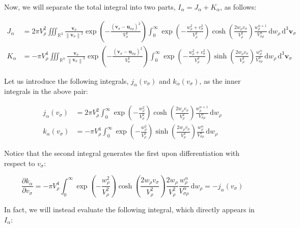 Now, we will separate the total integral into two parts, $I_\alpha=J_\alpha+K_\alpha$, as follows:

\begin{align*}
    J_\alpha&=2\pi V_\rho^2\iiint_{\mathbb{R}^3}\frac{\mathbf{v}_\sigma}{\left\|\mathbf{v}_\sigma\right\|^2}\exp{\left(-\frac{\left(\mathbf{v}_\sigma-\mathbf{u}_{\sigma\rho}\right)^2}{V_\sigma^2}\right)}\int_0^\infty\exp{\left(-\frac{w_\rho^2+v_\sigma^2}{V_\rho^2}\right)}\cosh{\left(\frac{2w_\rho v_\sigma}{V_\rho^2}\right)}\frac{w_\rho^{\alpha+1}}{V_{\sigma\rho}^\alpha}\,\mathrm{d}w_\rho\,\mathrm{d^3}\mathbf{v}_\sigma\\
    K_\alpha&=-\pi V_\rho^4\iiint_{\mathbb{R}^3}\frac{\mathbf{v}_\sigma}{\left\|\mathbf{v}_\sigma\right\|^3}\exp{\left(-\frac{\left(\mathbf{v}_\sigma-\mathbf{u}_{\sigma\rho}\right)^2}{V_\sigma^2}\right)}\int_0^\infty\exp{\left(-\frac{w_\rho^2+v_\sigma^2}{V_\rho^2}\right)}\sinh{\left(\frac{2w_\rho v_\sigma}{V_\rho^2}\right)}\frac{w_\rho^{\alpha}}{V_{\sigma\rho}^\alpha}\,\mathrm{d}w_\rho\,\mathrm{d^3}\mathbf{v}_\sigma
\end{align*}

Let us introduce the following integrals, $j_\alpha(v_\sigma)$ and $k_\alpha(v_\sigma)$, as the inner integrals in the above pair:

\begin{align*}
    j_\alpha(v_\sigma)&=2\pi V_\rho^2\int_0^\infty\exp{\left(-\frac{w_\rho^2}{V_\rho^2}\right)}\cosh{\left(\frac{2w_\rho v_\sigma}{V_\rho^2}\right)}\frac{w_\rho^{\alpha+1}}{V_{\sigma\rho}^\alpha}\,\mathrm{d}w_\rho\\
    k_\alpha(v_\sigma)&=-\pi V_\rho^4\int_0^\infty\exp{\left(-\frac{w_\rho^2}{V_\rho^2}\right)}\sinh{\left(\frac{2w_\rho v_\sigma}{V_\rho^2}\right)}\frac{w_\rho^\alpha}{V_{\sigma\rho}^\alpha}\,\mathrm{d}w_\rho
\end{align*}

Notice that the second integral generates the first upon differentiation with respect to $v_\sigma$:

\begin{equation*}
    \frac{\partial k_\alpha}{\partial v_\sigma}=-\pi V_\rho^4\int_0^\infty\exp{\left(-\frac{w_\rho^2}{V_\rho^2}\right)}\cosh{\left(\frac{2 w_\rho v_\sigma}{V_\rho^2}\right)}\frac{2 w_\rho}{V_\rho^2}\frac{w_\rho^\alpha}{V_{\sigma\rho}^\alpha}\,\mathrm{d}w_\rho=-j_\alpha(v_\sigma)
\end{equation*}

In fact, we will instead evaluate the following integral, which directly appears in $I_\alpha$:

